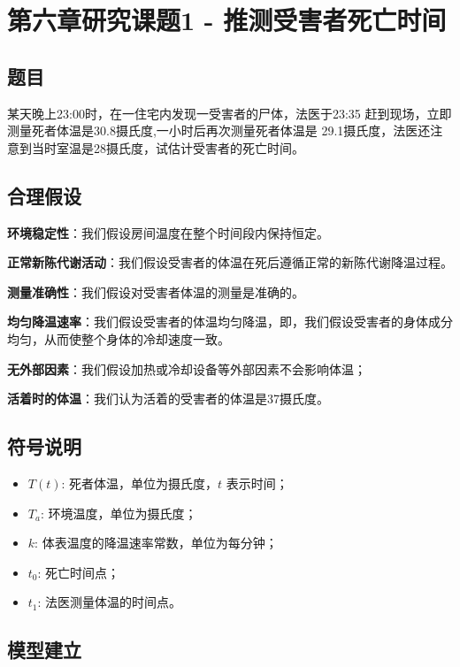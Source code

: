 \documentclass[a4,10pt,zihao=-4]{ctexart}
\begin{document}
\newpage
\section{第六章研究课题1 - 推测受害者死亡时间}

\subsection{题目}
某天晚上23:00时，在一住宅内发现一受害者的尸体，法医于23:35 赶到现场，立即测量死者体温是30.8摄氏度,一小时后再次测量死者体温是 29.1摄氏度，法医还注意到当时室温是28摄氏度，试估计受害者的死亡时间。

\subsection{合理假设}

\textbf{环境稳定性}：我们假设房间温度在整个时间段内保持恒定。

\textbf{正常新陈代谢活动}：我们假设受害者的体温在死后遵循正常的新陈代谢降温过程。

\textbf{测量准确性}：我们假设对受害者体温的测量是准确的。

\textbf{均匀降温速率}：我们假设受害者的体温均匀降温，即，我们假设受害者的身体成分均匀，从而使整个身体的冷却速度一致。

\textbf{无外部因素}：我们假设加热或冷却设备等外部因素不会影响体温；

\textbf{活着时的体温}：我们认为活着的受害者的体温是37摄氏度。


\subsection{符号说明}
\begin{itemize}
    \item \( T(t) \): 死者体温，单位为摄氏度，\( t \) 表示时间；
    \item \( T_a \): 环境温度，单位为摄氏度；
    \item \( k \): 体表温度的降温速率常数，单位为每分钟；
    \item \( t_0 \): 死亡时间点；
    \item \( t_1 \): 法医测量体温的时间点。
\end{itemize}

\subsection{模型建立}
\end{document}
